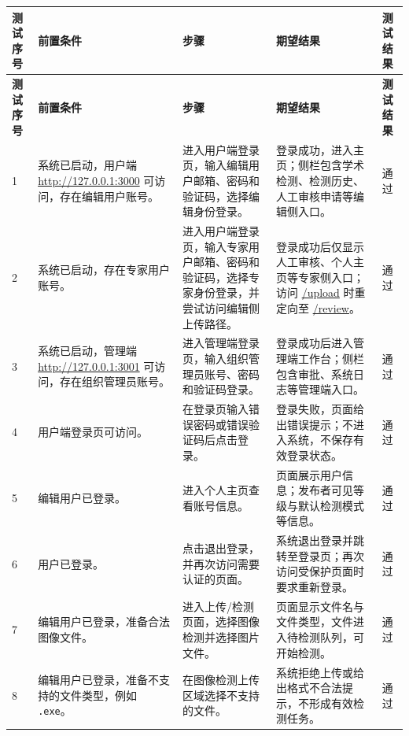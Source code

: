 \documentclass[UTF8,a4paper,12pt]{ctexart}
\newcommand{\pass}{通过}
\begin{document}
\begin{longtable}{|P{0.9cm}|P{3.5cm}|P{4.7cm}|P{5.0cm}|P{1.2cm}|}
\hline
\textbf{测试序号} & \textbf{前置条件} & \textbf{步骤} & \textbf{期望结果} & \textbf{测试结果} \\
\hline
\endfirsthead

\hline
\textbf{测试序号} & \textbf{前置条件} & \textbf{步骤} & \textbf{期望结果} & \textbf{测试结果} \\
\hline
\endhead

1 & 系统已启动，用户端 \url{http://127.0.0.1:3000} 可访问，存在编辑用户账号。 & 进入用户端登录页，输入编辑用户邮箱、密码和验证码，选择编辑身份登录。 & 登录成功，进入主页；侧栏包含学术检测、检测历史、人工审核申请等编辑侧入口。 & \pass \\
\hline

2 & 系统已启动，存在专家用户账号。 & 进入用户端登录页，输入专家用户邮箱、密码和验证码，选择专家身份登录，并尝试访问编辑侧上传路径。 & 登录成功后仅显示人工审核、个人主页等专家侧入口；访问 \url{/upload} 时重定向至 \url{/review}。 & \pass \\
\hline

3 & 系统已启动，管理端 \url{http://127.0.0.1:3001} 可访问，存在组织管理员账号。 & 进入管理端登录页，输入组织管理员账号、密码和验证码登录。 & 登录成功后进入管理端工作台；侧栏包含审批、系统日志等管理端入口。 & \pass \\
\hline

4 & 用户端登录页可访问。 & 在登录页输入错误密码或错误验证码后点击登录。 & 登录失败，页面给出错误提示；不进入系统，不保存有效登录状态。 & \pass \\
\hline

5 & 编辑用户已登录。 & 进入个人主页查看账号信息。 & 页面展示用户信息；发布者可见等级与默认检测模式等信息。 & \pass \\
\hline

6 & 用户已登录。 & 点击退出登录，并再次访问需要认证的页面。 & 系统退出登录并跳转至登录页；再次访问受保护页面时要求重新登录。 & \pass \\
\hline

7 & 编辑用户已登录，准备合法图像文件。 & 进入上传/检测页面，选择图像检测并选择图片文件。 & 页面显示文件名与文件类型，文件进入待检测队列，可开始检测。 & \pass \\
\hline

8 & 编辑用户已登录，准备不支持的文件类型，例如 \texttt{.exe}。 & 在图像检测上传区域选择不支持的文件。 & 系统拒绝上传或给出格式不合法提示，不形成有效检测任务。 & \pass \\
\hline


\end{longtable}
\end{document}
